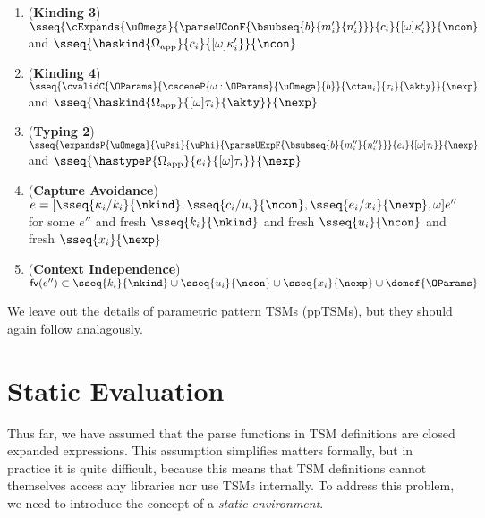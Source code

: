 \documentclass[acmlarge,review,anonymous]{acmart}\settopmatter{printfolios=true}
\begin{document}
\begin{theorem}
\begin{enumerate}[nolistsep]
  \item (\textbf{Kinding 3}) $\sseq{\cExpands{\uOmega}{\parseUConF{\bsubseq{b}{m'_i}{n'_i}}}{c_i}{[\omega]\kappa'_i}}{\ncon}$ and $\sseq{\haskind{\Omega_\text{app}}{c_i}{[\omega]\kappa'_i}}{\ncon}$
  \item (\textbf{Kinding 4}) $\sseq{\cvalidC{\OParams}{\csceneP{\omega : \OParams}{\uOmega}{b}}{\ctau_i}{\tau_i}{\akty}}{\nexp}$ and $\sseq{\haskind{\Omega_\text{app}}{[\omega]\tau_i}{\akty}}{\nexp}$
  \item (\textbf{Typing 2}) $\sseq{\expandsP{\uOmega}{\uPsi}{\uPhi}{\parseUExpF{\bsubseq{b}{m''_i}{n''_i}}}{e_i}{[\omega]\tau_i}}{\nexp}$ and $\sseq{\hastypeP{\Omega_\text{app}}{e_i}{[\omega]\tau_i}}{\nexp}$
  \item (\textbf{Capture Avoidance}) $e = [\sseq{\kappa_i/k_i}{\nkind}, \sseq{c_i/u_i}{\ncon}, \sseq{e_i/x_i}{\nexp}, \omega]e''$ for some $e''$ and fresh $\sseq{k_i}{\nkind}$ and fresh $\sseq{u_i}{\ncon}$ and fresh $\sseq{x_i}{\nexp}$
  \item (\textbf{Context Independence}) $\mathsf{fv}(e'') \subset \sseq{k_i}{\nkind} \cup \sseq{u_i}{\ncon} \cup \sseq{x_i}{\nexp} \cup \domof{\OParams}$
\end{enumerate}
\end{theorem}
We leave out the details of parametric pattern TSMs (ppTSMs), but they should again follow analagously.

\newcommand{\staticEvalSec}{Static Evaluation}
\section{\protect\staticEvalSec}
\label{sec:static-eval}

Thus far, we have assumed that the parse functions in TSM definitions are closed expanded expressions. This assumption simplifies matters formally, but in practice it is quite difficult, because this means that TSM definitions cannot themselves access any libraries nor use TSMs internally. To address this problem, we need to introduce the concept of a \emph{static environment}. 
\end{document}
